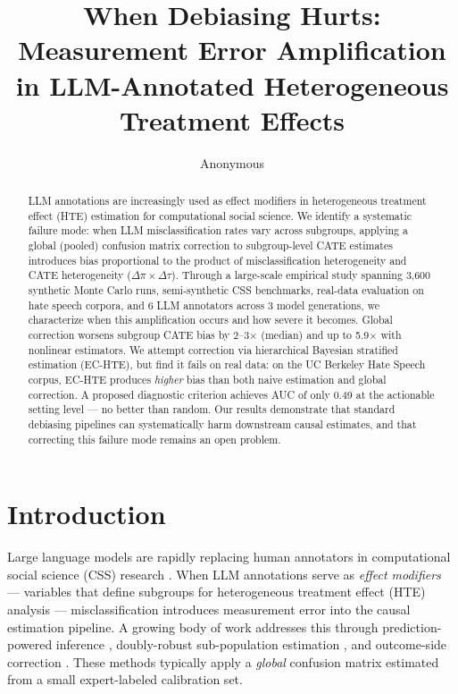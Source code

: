 \documentclass[11pt]{article}
\title{When Debiasing Hurts: Measurement Error Amplification\\in LLM-Annotated Heterogeneous Treatment Effects}
\author{Anonymous}
\begin{document}
\maketitle

\begin{abstract}
LLM annotations are increasingly used as effect modifiers in heterogeneous treatment effect (HTE) estimation for computational social science.
We identify a systematic failure mode: when LLM misclassification rates vary across subgroups, applying a global (pooled) confusion matrix correction to subgroup-level CATE estimates introduces bias proportional to the product of misclassification heterogeneity and CATE heterogeneity ($\Delta\pi \times \Delta\tau$).
Through a large-scale empirical study spanning 3{,}600 synthetic Monte Carlo runs, semi-synthetic CSS benchmarks, real-data evaluation on hate speech corpora, and 6 LLM annotators across 3 model generations, we characterize when this amplification occurs and how severe it becomes.
Global correction worsens subgroup CATE bias by 2--3$\times$ (median) and up to 5.9$\times$ with nonlinear estimators.
We attempt correction via hierarchical Bayesian stratified estimation (EC-HTE), but find it fails on real data: on the UC Berkeley Hate Speech corpus, EC-HTE produces \emph{higher} bias than both naive estimation and global correction.
A proposed diagnostic criterion achieves AUC of only 0.49 at the actionable setting level --- no better than random.
Our results demonstrate that standard debiasing pipelines can systematically harm downstream causal estimates, and that correcting this failure mode remains an open problem.
\end{abstract}

\section{Introduction}
\label{sec:intro}

Large language models are rapidly replacing human annotators in computational social science (CSS) research \cite{tornberg2024chatgpt,gilardi2023chatgpt,ziems2024can}.
When LLM annotations serve as \emph{effect modifiers} --- variables that define subgroups for heterogeneous treatment effect (HTE) analysis --- misclassification introduces measurement error into the causal estimation pipeline.
A growing body of work addresses this through prediction-powered inference \cite{angelopoulos2023prediction}, doubly-robust sub-population estimation \cite{egami2024using}, and outcome-side correction \cite{sui2026ppci}.
These methods typically apply a \emph{global} confusion matrix estimated from a small expert-labeled calibration set.
\end{document}
